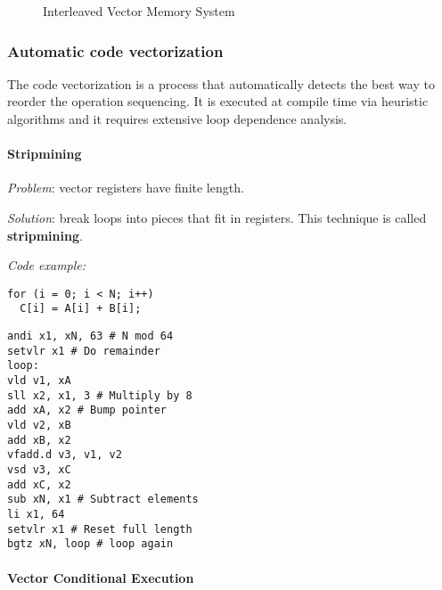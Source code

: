 \documentclass[english]{article}
\begin{document}
\begin{figure}[htbp]
  \bigskip
  \centering
  \caption{Interleaved Vector Memory System}
  \label{fig:interleaved-vector-memory-system}
  \bigskip
\end{figure}

\subsubsection{Automatic code vectorization}

The code vectorization is a process that automatically detects the best way to reorder the operation sequencing.
It is executed at compile time via heuristic algorithms and it requires extensive loop dependence analysis.

\paragraph{Stripmining}

\textit{Problem}: vector registers have finite length.

\textit{Solution}: break loops into pieces that fit in registers.
This technique is called \textbf{stripmining}.

\bigskip
\textit{Code example:}
\bigskip

\begin{minipage}{\textwidth}
  \begin{minipage}[t]{0.33\textwidth}
    \begin{verbatim}
for (i = 0; i < N; i++)
  C[i] = A[i] + B[i];
  \end{verbatim}
  \end{minipage}
  \begin{minipage}[t]{0.33\textwidth}
    \begin{verbatim}
andi x1, xN, 63 # N mod 64
setvlr x1 # Do remainder
loop:
vld v1, xA
sll x2, x1, 3 # Multiply by 8
add xA, x2 # Bump pointer
vld v2, xB
add xB, x2
vfadd.d v3, v1, v2
vsd v3, xC
add xC, x2
sub xN, x1 # Subtract elements
li x1, 64
setvlr x1 # Reset full length
bgtz xN, loop # loop again
  \end{verbatim}
  \end{minipage}
  \begin{minipage}[t]{0.33\textwidth}
    \centering
  \end{minipage}
\end{minipage}

\paragraph{Vector Conditional Execution}
\label{par:vector-conditional-execution}
\end{document}
